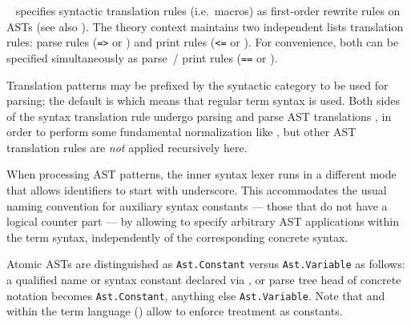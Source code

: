 \begin{isabellebody}
\begin{isamarkuptext}
\begin{description}
  \item \hyperlink{command.translations}{\mbox{}}~ specifies syntactic
  translation rules (i.e.\ macros) as first-order rewrite rules on
  ASTs (see also ).  The theory context maintains two
  independent lists translation rules: parse rules (\verb|=>|
  or ) and print rules (\verb|<=| or ).
  For convenience, both can be specified simultaneously as parse~/
  print rules (\verb|==| or ).

  Translation patterns may be prefixed by the syntactic category to be
  used for parsing; the default is  which means that
  regular term syntax is used.  Both sides of the syntax translation
  rule undergo parsing and parse AST translations
  , in order to perform some fundamental
  normalization like , but other AST
  translation rules are \emph{not} applied recursively here.

  When processing AST patterns, the inner syntax lexer runs in a
  different mode that allows identifiers to start with underscore.
  This accommodates the usual naming convention for auxiliary syntax
  constants --- those that do not have a logical counter part --- by
  allowing to specify arbitrary AST applications within the term
  syntax, independently of the corresponding concrete syntax.

  Atomic ASTs are distinguished as \verb|Ast.Constant| versus \verb|Ast.Variable| as follows: a qualified name or syntax constant
  declared via \hyperlink{command.syntax}{\mbox{}}, or parse tree head of concrete
  notation becomes \verb|Ast.Constant|, anything else \verb|Ast.Variable|.  Note that  and  within
  the term language () allow to enforce
  treatment as constants.


\end{description}
\end{isamarkuptext}
\end{isabellebody}
